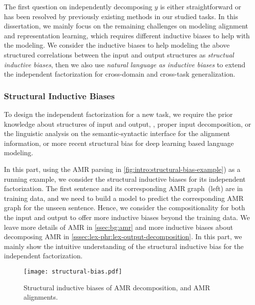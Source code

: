 {The first question on independently decomposing $y$ is either
straightforward or has been resolved by previously existing methods in
our studied tasks. In this dissertation, we mainly focus on the remaining
challenges on modeling alignment and representation learning, which
requires different inductive biases to help with the
modeling. We consider the inductive biases to
help modeling the above structured correlations between the input and
output structures as \emph{structual inductive biases}, then we also
use \emph{natural language as inductive biases} to extend the
independent factorization for cross-domain and cross-task
generalization.

\subsubsection{Structural Inductive Biases}
\label{sssec:intro:structural-biases}
To design the independent factorization for a new task, we require the
prior knowledge about structures of input and output, \eg, proper
input decomposition, or the linguistic analysis on the
semantic-syntactic interface for the alignment information, or more
recent structural bias for deep learning based language modeling.

In this part, using the AMR parsing in
\autoref{fig:intro:structural-bias-example}) as a running example, we
consider the structural inductive biases for its independent
factorization. The first sentence and its corresponding AMR
graph~(left) are in training data, and we need to build a model to
predict the corresponding AMR graph for the unseen sentence. Hence, we
consider the compositionality for both the input and output to offer
more inductive biases beyond the training data. We leave more details
of AMR in \autoref{ssec:bg:amr} and more inductive biases about
decomposing AMR in
\autoref{sssec:lex-phr:lex-output-decomposition}. In this part, we
mainly show the intuitive understanding of the structural inductive
bias for the independent factorization.

\begin{figure}[!tbp]
  \begin{center}
  \texttt{[image: structural-bias.pdf]}
  \end{center}
  \caption{\label{fig:intro:structural-bias-example} Structural inductive
    biases of AMR decomposition, and AMR alignments.}
\end{figure}

}
